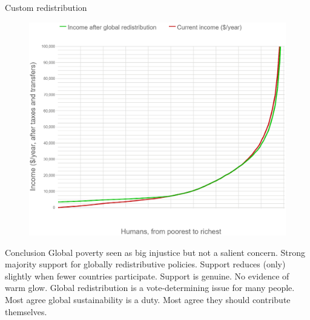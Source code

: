 \documentclass[aspectratio=169,xcolor=dvipsnames, 11pt,mathserif]{beamer}
\begin{document}
\begin{frame}{Custom redistribution \href{run:../figures/questionnaire/survey_custom_redistr.mp4}{}}
{\begin{figure}
    \includegraphics[height=.83\textheight]{../figures/questionnaire/survey_custom_redistr_median_zoom.png}\end{figure}}
\end{frame}

\begin{frame}{Conclusion}
\bbs
\ip Global poverty seen as big injustice but not a salient concern.
\ip Strong majority support for globally redistributive policies.
\ip Support reduces (only) slightly when fewer countries participate.
\ip Support is genuine. No evidence of warm glow.
\ip Global redistribution is a vote-determining issue for many people. %
\ip Most agree global sustainability is a duty.
\ip Most agree they should contribute themselves.
\ee
\end{frame}
\end{document}
